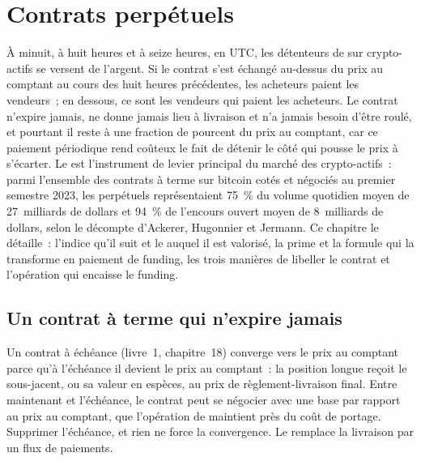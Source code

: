 \chapter{Contrats perpétuels}\label{ch:m3:perpetual-futures}

À minuit, à huit heures et à seize heures, en UTC, les détenteurs de  sur crypto-actifs se versent
de l'argent. Si le contrat s'est échangé au-dessus du prix au comptant au cours des huit
heures précédentes, les acheteurs paient les vendeurs~; en dessous, ce sont les vendeurs qui paient les acheteurs. Le contrat n'expire jamais, ne
donne jamais lieu à livraison et n'a jamais besoin d'être roulé, et pourtant il reste à une fraction de pourcent du prix au comptant, car
ce paiement périodique rend coûteux le fait de détenir le côté qui pousse le prix à s'écarter. Le 
est l'instrument de levier principal du marché des crypto-actifs~: parmi l'ensemble des contrats à terme sur bitcoin cotés et négociés au premier semestre 2023,
les perpétuels représentaient 75~\% du volume quotidien moyen de 27~milliards de dollars et 94~\% de
l'encours ouvert moyen de 8~milliards de dollars, selon le décompte d'Ackerer, Hugonnier et Jermann. Ce chapitre le détaille~:
l'indice qu'il suit et le  auquel il est valorisé, la prime et la formule qui la
transforme en paiement de funding, les trois manières de libeller le contrat et l'opération qui encaisse le
funding.

\section{Un contrat à terme qui n'expire jamais}

Un contrat à échéance (livre~1, chapitre~18) converge vers le prix au comptant parce qu'à l'échéance il devient le prix au comptant~: la
position longue reçoit le sous-jacent, ou sa valeur en espèces, au prix de règlement-livraison final. Entre maintenant et
l'échéance, le contrat peut se négocier avec une base par rapport au prix au comptant, que l'opération de  maintient près du
coût de portage. Supprimer l'échéance, et rien ne force la convergence. Le  remplace la livraison par un flux de
paiements.

